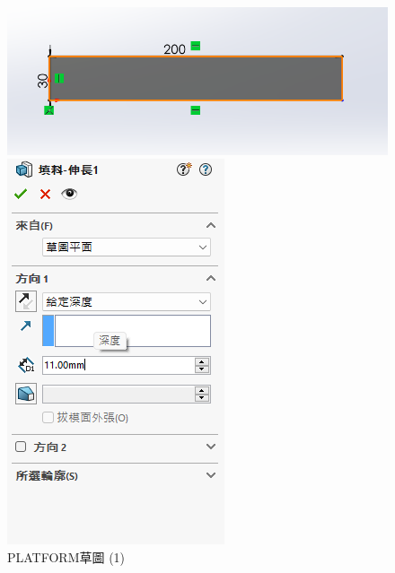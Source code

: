 \begin{figure}[h!]
    \centering
    \begin{minipage}[b]{0.6\textwidth}
        \centering
        \includegraphics[width=\textwidth,height=0.22\textheight]{./../images/6-1-11}
        \caption{PLATFORM草圖 (1)}
        \label{fig:platform}
    \end{minipage}
    \hfill
    \begin{minipage}[b]{0.35\textwidth}
        \centering
        \includegraphics[width=\textwidth,height=0.25\textheight]{./../images/6-1-12} 

\end{minipage}
\end{figure}
